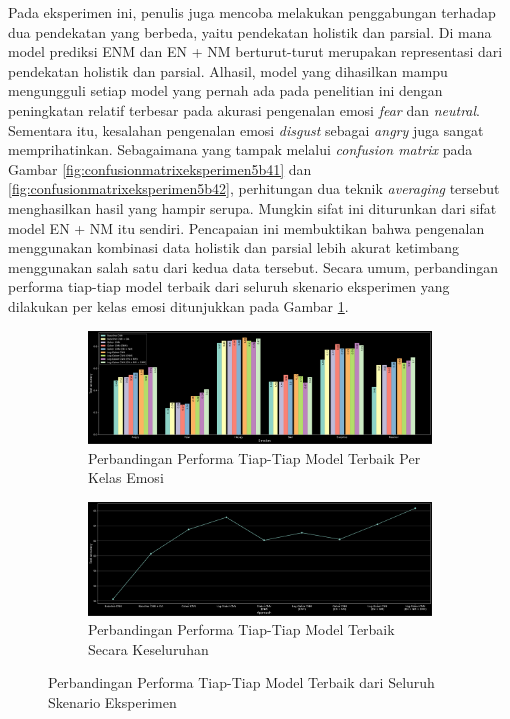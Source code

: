 Pada eksperimen ini, penulis juga mencoba melakukan penggabungan terhadap dua pendekatan yang berbeda, yaitu pendekatan holistik dan parsial. Di mana model prediksi ENM dan EN + NM berturut-turut merupakan representasi dari pendekatan holistik dan parsial. Alhasil, model yang dihasilkan mampu mengungguli setiap model yang pernah ada pada penelitian ini dengan peningkatan relatif terbesar pada akurasi pengenalan emosi \textit{fear} dan \textit{neutral}. Sementara itu, kesalahan pengenalan emosi \textit{disgust} sebagai \textit{angry} juga sangat memprihatinkan. Sebagaimana yang tampak melalui \textit{confusion matrix} pada Gambar \ref{fig:confusionmatrixeksperimen5b41} dan \ref{fig:confusionmatrixeksperimen5b42}, perhitungan dua teknik \textit{averaging} tersebut menghasilkan hasil yang hampir serupa. Mungkin sifat ini diturunkan dari sifat model EN + NM itu sendiri. Pencapaian ini membuktikan bahwa pengenalan menggunakan kombinasi data holistik dan parsial lebih akurat ketimbang menggunakan salah satu dari kedua data tersebut. Secara umum, perbandingan performa tiap-tiap model terbaik dari seluruh skenario eksperimen yang dilakukan per kelas emosi ditunjukkan pada Gambar \ref{fig:perbandinganeksperimen1hingga5}.

\begin{figure}[!t]
    \begin{subfigure}{14cm}
        \includegraphics[width=14cm]{gambar/eksperimen1to5_grafik1.png}
        \caption{Perbandingan Performa Tiap-Tiap Model Terbaik Per Kelas Emosi}
    \end{subfigure}

    \begin{subfigure}{14cm}
        \includegraphics[width=14cm]{gambar/eksperimen1to5_grafik2.png}
        \caption{Perbandingan Performa Tiap-Tiap Model Terbaik Secara Keseluruhan}
    \end{subfigure}
    \caption{Perbandingan Performa Tiap-Tiap Model Terbaik dari Seluruh Skenario Eksperimen}
    \label{fig:perbandinganeksperimen1hingga5}
\end{figure}

